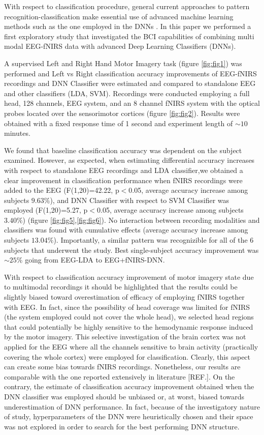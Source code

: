 \documentclass[12pt ]{iopart}
\begin{document}
 With respect to classification procedure, general current approaches to pattern recognition-classification  make essential use of advanced machine learning methods such as the one employed in the DNNs \parencite{lecun2015deep}. 
In this paper we performed a first exploratory study that investigated the BCI capabilities of combining multi modal EEG-fNIRS data  with advanced Deep Learning Classifiers (DNNs). 

 A supervised Left and Right Hand Motor Imagery task (figure \ref{fig:fig1}) was performed and Left vs Right classification accuracy improvements of EEG-fNIRS recordings and DNN Classifier were estimated and compared to standalone EEG and other classifiers (LDA, SVM). Recordings were conducted employing a full head, 128 channels, EEG system, and an 8 channel fNIRS system with the optical probes located over the sensorimotor cortices (figure \ref{fig:fig2}). Results were obtained with a fixed response time of 1 second and experiment length of $\sim10$ minutes.

We found that baseline classification accuracy was dependent on the subject examined. However, as expected, when estimating differential accuracy increases  with respect to standalone EEG recordings and LDA classifier,we obtained a clear improvement in classification performance when fNIRS recordings were added to the EEG (F(1,20)=42.22, p$<$0.05, average accuracy increase among subjects $9.63\%$), and DNN Classifier with respect to SVM Classifier was employed (F(1,20)=5.27, p$<$0.05, average accuracy increase among subjects $3.40\%$) (figure \ref{fig:fig5},\ref{fig:fig6}).  No interaction between recording modalities and classifiers was found with cumulative effects (average accuracy increase among subjects $13.04\%$). Importantly, a similar pattern was recognizible for all of the 6 subjects that underwent the study. Best single-subject accuracy  improvement was $\sim25\%$ going from EEG-LDA to EEG+fNIRS-DNN. 

With respect to classification accuracy improvement of motor imagery state due to  multimodal recordings it should be highlighted that the results could be slightly biased toward overestimation of efficacy of employing fNIRS together with EEG. In fact, since the possibility of head coverage was limited for fNIRS (the system employed could not cover the whole head), we  selected head regions that could potentially be highly sensitive to the hemodynamic response induced by the motor imagery. This selective investigation of the brain cortex was not applied for the EEG  where all the channels sensitive to brain activity (practically covering the whole cortex) were employed for classification. Clearly, this aspect can create some bias towards fNIRS recordings. Nonetheless, our results are comparable  with the one reported extensively in literature [REF.]. On the contrary,  the estimate of classification accuracy improvement obtained when the DNN classifier was employed should be unbiased or, at worst, biased towards underestimation of DNN performance. In fact, because of the investigatory nature of study, hyperparameters of the DNN were heuristically chosen and their space was not explored in order to search for the best performing DNN structure.
 
\end{document}
